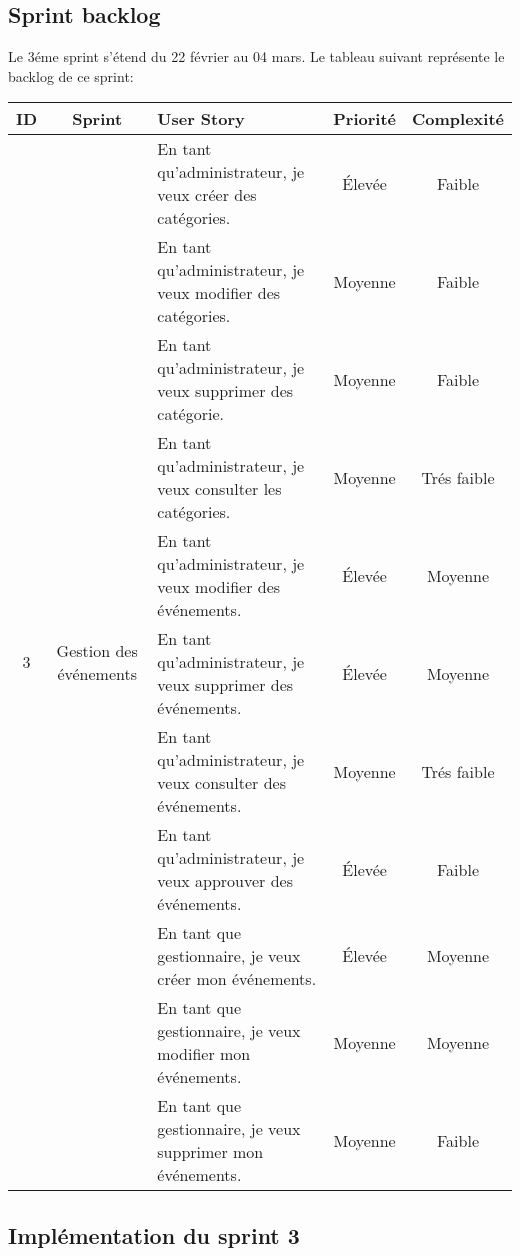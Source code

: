 \subsection{Sprint backlog}
Le 3éme sprint s’étend du 22 février au 04 mars. Le tableau suivant représente le backlog de ce sprint:
\begin{table}[h!]
\renewcommand{\arraystretch}{1.6}
\setlength{\tabcolsep}{5pt}
\centering
\begin{tabular}{|c|c|m{7cm}|c|c|}
\hline
\textbf{ID} & \textbf{Sprint} & \textbf{User Story} & \textbf{Priorité} & \textbf{Complexité} \\
\hline

\multirow{11}{*}{3} & \multirow{11}{*}{\parbox{3cm}{\centering Gestion des événements}}
& En tant qu’administrateur, je veux créer des catégories. & Élevée & Faible \\
\cline{3-5}
&& En tant qu’administrateur, je veux modifier des catégories. & Moyenne & Faible \\
\cline{3-5}
&& En tant qu’administrateur, je veux supprimer des catégorie. & Moyenne & Faible\\
\cline{3-5}
&& En tant qu’administrateur, je veux consulter les catégories. & Moyenne & Trés  faible \\
\cline{3-5}
&& En tant qu’administrateur, je veux modifier des événements. & Élevée & Moyenne \\
\cline{3-5}
& & En tant qu’administrateur, je veux supprimer des événements. & Élevée & Moyenne \\
\cline{3-5}
& & En tant qu’administrateur, je veux consulter des événements. & Moyenne  & Trés faible \\
\cline{3-5}
& & En tant qu’administrateur, je veux approuver des événements. & Élevée & Faible \\
\cline{3-5}
& & En tant que gestionnaire, je veux créer mon événements. & Élevée & Moyenne \\
\cline{3-5}
& & En tant que gestionnaire, je veux modifier mon événements. & Moyenne & Moyenne \\
\cline{3-5}
& & En tant que gestionnaire, je veux supprimer mon  événements. & Moyenne & Faible \\
\hline

\end{tabular}
\end{table}
\subsection{Implémentation du sprint 3}
